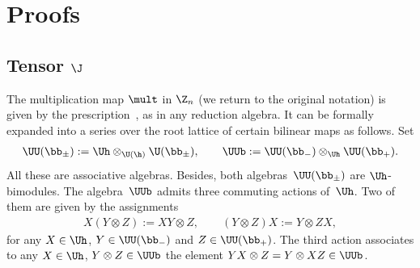 \section{Proofs}\label{sectionproofs}


\subsection[Tensor $\J$]{Tensor $\boldsymbol{\J}$}\label{sectionJ}

The multiplication map $\mult$ in $\Z_n$ (we return to the original notation) is given by the
prescription~, as in any reduction algebra. It can be formally expanded into
a series over the root lattice of certain bilinear maps as follows. Set
\begin{gather*}
\UU(\bb_\pm):=\Uh\otimes_{\U(\h)}\U(\bb_\pm)  , \qquad \UUb:=\UU(\bb_-)\otimes_{\Uh}  \UU(\bb_+)  .
\end{gather*}
All these are associative algebras. Besides, both algebras~$\UU(\bb_\pm)$ are $\Uh$-bimodules. The
algebra~$\UUb$ admits three commuting actions of~$\Uh$. Two of them are given by the assignments
\begin{gather*}
X(Y\otimes Z):=XY\otimes Z  ,\qquad (Y\otimes Z)X:=Y\otimes ZX  ,
\end{gather*}
for any $X\in\Uh$, $Y\in\UU(\bb_-)$ and $Z\in\UU(\bb_+)$.
The third action associates to any $X\in\Uh$, $Y\otimes Z\in\UUb$ the element $YX\otimes Z=Y\otimes XZ\in\UUb$.


